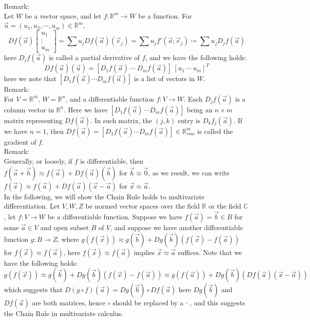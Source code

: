 \documentclass[11pt,oneside]{book}
\theoremstyle{break}
\theoremstyle{break}
\newcommand{\R}{\mathbb{R}}
\newcommand{\Complex}{\mathbb{C}}
\newcommand{\remark}{\color{blue}Remark: \color{black}}
\begin{document}
\remark \\
Let $W$ be a vector space, and let $f:\R^m \to W$ be a function. For $\vec{u} = (u_1,u_2,\cdots,u_m) \in \R^m$, $$Df(\vec{a})\begin{bmatrix}
u_1\\ \vdots \\ u_m
\end{bmatrix} = \sum u_j Df(\vec{a})(\vec{e}_j) = \sum u_j f'(\vec{a};\vec{e}_j) \coloneqq \sum u_j D_jf(\vec{a})
$$ here $D_jf(\vec{a})$ is called a partial derivative of $f$, and we have the following holds: $$Df(\vec{a})(\vec{u}) = [D_1f(\vec{a})\ \cdots\ D_mf(\vec{a})]\ [u_1\ \cdots\ u_m]^T$$
here we note that $[D_1f(\vec{a})\cdots D_mf(\vec{a})]$ is a list of vectors in $W$.\\

\remark \\
For $V = \R^m$, $W = \R^n$, and a differentiable function $f:V \to W$. Each $D_jf(\vec{a})$ is a column vector in $\R^n$. Here we have $[D_1f(\vec{a})\ \cdots D_mf(\vec{a})]$ being an $n\times m$ matrix representing $Df(\vec{a})$. In such matrix, the $(j,k)$ entry is $D_kf_j(\vec{a})$. If we have $n=1$, then $Df(\vec{a}) = [D_1f(\vec{a})\cdots D_mf(\vec{a})]\in \R_{row}^m$ is called the gradient of $f$.\\

\remark \\
Generally, or loosely, if $f$ is differentiable, then $f(\vec{a}+\vec{h}) \approx f(\vec{a}) + Df(\vec{a})(\vec{h})$ for $\vec{h}\approx \vec{0}$, as we result, we can write $f(\vec{x}) \approx f(\vec{a}) + Df(\vec{a}) (\vec{x}-\vec{a})$ for $\vec{x}\approx \vec{a}$.\\

In the following, we will show the Chain Rule holds to multivariate differentiation. Let $V,W,Z$ be normed vector spaces over the field $\R$ or the field $\Complex$, let $f:V \to W$ be a differentiable function. Suppose we have $f(\vec{a})= \vec{b}\in B$ for some $\vec{a}\in V$ and open subset $B$ of $V$, and suppose we have another differentiable function $g:B \to Z$, where $g(f(\vec{x}))\approx g(\vec{b})+Dg(\vec{b})(f(\vec{x})-f(\vec{a}))$ for $f(\vec{x}) \approx f(\vec{a})$, here $f(\vec{x}) \approx f(\vec{a})$ implies $\vec{x}\approx \vec{a}$ suffices. Note that we have the following holds:$$g(f(\vec{x})) \approx g(\vec{b})+Dg(\vec{b})(f(\vec{x})-f(\vec{a})) \approx g(f(\vec{a}))+Dg(\vec{b})(Df(\vec{a})(\vec{x}-\vec{a}))$$ which suggests that $D(g\circ f)(\vec{a}) = Dg(\vec{b})\circ Df(\vec{a})$ here $Dg(\vec{b})$ and $Df(\vec{a})$ are both matrices, hence $\circ$ should be replaced by a $\cdot$ , and this suggests the Chain Rule in multivariate calculus. \\
\end{document}
